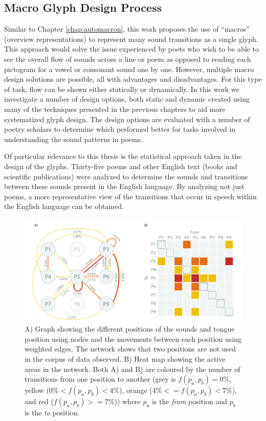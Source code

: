 \subsection{Macro Glyph Design Process}

Similar to Chapter \ref{chap:automacron}, this work proposes the use of ``macros'' (overview representations) to represent many sound transitions as a single glyph.
This approach would solve the issue experienced by poets who wish to be able to see the overall flow of sounds across a line or poem as opposed to reading each pictogram for a vowel or consonant sound one by one.  
However, multiple macro design solutions are possible, all with advantages and disadvantages.
For this type of task, flow can be shown either statically or dynamically. 
In this work we investigate a number of design options, both static and dynamic created using many of the techniques presented in the previous chapters to aid more systematized glyph design. 
The design options are evaluated with a number of poetry scholars to determine which performed better for tasks involved in understanding the sound patterns in poems.  

Of particular relevance to this thesis is the statistical approach taken in the design of the glyphs. 
Thirty-five poems and other English text (books and scientific publications) were analyzed to determine the sounds and transitions between these sounds present in the English language. 
By analyzing not just poems, a more representative view of the transitions that occur in speech within the English language can be obtained.

\begin{figure}[th!]
\centering
\includegraphics[width=\textwidth]{images/other_glyphs/macro_stats}
\caption{A) Graph showing the different positions of the sounds and tongue position using nodes and the movements between each position using weighted edges. The network shows that two positions are not used in the corpus of data observed.
B) Heat map showing the active areas in the network. 
Both A) and B) are coloured by the number of transitions from one position to another (grey is $f(p_a, p_b) = 0\%$, yellow ($0\%<f(p_a, p_b)< 4\%$), orange ($4\%<=f(p_a, p_b)<7\%$), and red ($f(p_a, p_b)>=7\%$)) where $p_a$ is the \emph{from} position and $p_b$ is the \emph{to} position.}
\label{fig:poem_statistics}
\end{figure}

